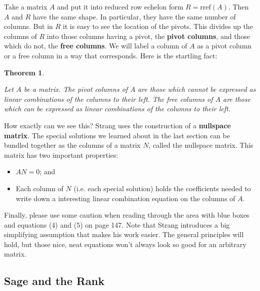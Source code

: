 \documentclass[10pt,]{book}
\newcommand{\terminology}[1]{\textbf{#1}}
\theoremstyle{plain}
\newtheorem{theorem}{Theorem}[chapter]
\numberwithin{equation}{section}
\begin{document}
      Take a matrix \(A\) and put it into reduced row echelon form
      \(R = \mathrm{rref}(A)\). Then \(A\) and \(R\) have the same shape.
      In particular, they have the same number of columns. But in \(R\)
      it is easy to see the location of the pivots. This divides up the
      columns of \(R\) into those columns having a pivot, the \terminology{pivot columns},
      and those which do not, the \terminology{free columns}.
      We will label a column of \(A\) as a pivot column or a free column in a way
      that corresponds. Here is the startling fact:
\begin{theorem}\label{theorem-3}

        Let \(A\) be a matrix.
        The pivot columns of \(A\) are those which cannot be expressed as linear
        combinations of the columns to their left.
        The free columns of \(A\) are those which can be expressed as linear
        combinations of the columns to their left.
      \end{theorem}
\par

      How exactly can we see this? Strang uses the construction of a
      \terminology{nullspace matrix}. The special solutions we learned about
      in the last section can be bundled together as the columns of a matrix
      \(N\), called the nullspace matrix. This matrix has two important
      properties:
\begin{itemize}
\item{} \(AN = 0\); and\item{} Each column of \(N\) (i.e. each special solution) holds the
          coefficients needed to write down a interesting linear combination
          equation on the columns of \(A\).
        \end{itemize}
\par

        Finally, please use some caution when reading through the area
        with blue boxes and equations (4) and (5) on page 147. Note that
        Strang introduces a big simplifying assumption that makes his work
        easier. The general principles will hold, but those nice, neat
        equations won't always look so good for an arbitrary matrix.
\typeout{************************************************}
\typeout{************************************************}
\subsection[Sage and the Rank]{Sage and the Rank}\label{subsection-71}
\end{document}
